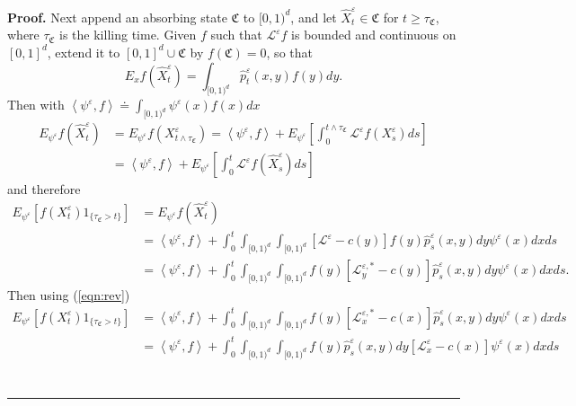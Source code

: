 \documentclass[english,11pt]{article}%
\numberwithin{equation}{section}
\numberwithin{example}{section}
\numberwithin{theorem}{section}
\newenvironment{proof}[1][Proof]{\noindent\textbf{#1.} }{\ \rule{0.5em}{0.5em}}
\begin{document}
\begin{proof}
Next append an absorbing state $\mathfrak{C}$ to $[0,1)^{d}$, and let $\hat
{X}_{t}^{\varepsilon}\in\mathfrak{C}$ for $t\geq\tau_{\mathfrak{C}}$, where
$\tau_{\mathfrak{C}}$ is the killing time. Given $f$ such that $\mathcal{L}%
^{\varepsilon}f$ is bounded and continuous on $[0,1]^{d}$, extend it to
$[0,1]^{d}\cup\mathfrak{C}$ by $f(\mathfrak{C})=0$, so that
\[
E_{x}f(\hat{X}_{t}^{\varepsilon})=\int_{[0,1)^{d}}\hat{p}_{t}^{\varepsilon
}(x,y)f(y)dy.
\]
Then with $\left\langle \psi^{\varepsilon},f\right\rangle \doteq\int
_{\lbrack0,1)^{d}}\psi^{\varepsilon}(x)f(x)dx$
\begin{align*}
E_{\psi^{\varepsilon}}f(\hat{X}_{t}^{\varepsilon})  &  =E_{\psi^{\varepsilon}%
}f(X_{t\wedge\tau_{\mathfrak{C}}}^{\varepsilon})=\left\langle \psi
^{\varepsilon},f\right\rangle +E_{\psi^{\varepsilon}}\left[  \int_{0}%
^{t\wedge\tau_{\mathfrak{C}}}\mathcal{L}^{\varepsilon}f(X_{s}^{\varepsilon
})ds\right] \\
&  =\left\langle \psi^{\varepsilon},f\right\rangle +E_{\psi^{\varepsilon}%
}\left[  \int_{0}^{t}\mathcal{L}^{\varepsilon}f(\hat{X}_{s}^{\varepsilon
})ds\right]
\end{align*}
and therefore
\begin{align*}
E_{\psi^{\varepsilon}}\left[  f(X_{t}^{\varepsilon})1_{\{\tau_{\mathfrak{C}%
}>t\}}\right]   &  =E_{\psi^{\varepsilon}}f(\hat{X}_{t}^{\varepsilon})\\
&  =\left\langle \psi^{\varepsilon},f\right\rangle +\int_{0}^{t}%
\int_{[0,1)^{d}}\int_{[0,1)^{d}}[\mathcal{L}^{\varepsilon}-c(y)]f(y)\hat
{p}_{s}^{\varepsilon}(x,y)dy\psi^{\varepsilon}(x)dxds\\
&  =\left\langle \psi^{\varepsilon},f\right\rangle +\int_{0}^{t}%
\int_{[0,1)^{d}}\int_{[0,1)^{d}}f(y)\left[  \mathcal{L}_{y}^{\varepsilon,\ast
}-c(y)\right]  \hat{p}_{s}^{\varepsilon}(x,y)dy\psi^{\varepsilon}(x)dxds.
\end{align*}
Then using (\ref{eqn:rev})%
\begin{align*}
E_{\psi^{\varepsilon}}\left[  f(X_{t}^{\varepsilon})1_{\{\tau_{\mathfrak{C}%
}>t\}}\right]   &  =\left\langle \psi^{\varepsilon},f\right\rangle +\int
_{0}^{t}\int_{[0,1)^{d}}\int_{[0,1)^{d}}f(y)[\mathcal{L}_{x}^{\varepsilon
,\ast}-c(x)]\hat{p}_{s}^{\varepsilon}(x,y)dy\psi^{\varepsilon}(x)dxds\\
&  =\left\langle \psi^{\varepsilon},f\right\rangle +\int_{0}^{t}%
\int_{[0,1)^{d}}\int_{[0,1)^{d}}f(y)\hat{p}_{s}^{\varepsilon}%
(x,y)dy[\mathcal{L}_{x}^{\varepsilon}-c(x)]\psi^{\varepsilon}(x)dxds\\

\end{align*}
\end{proof}
\end{document}

